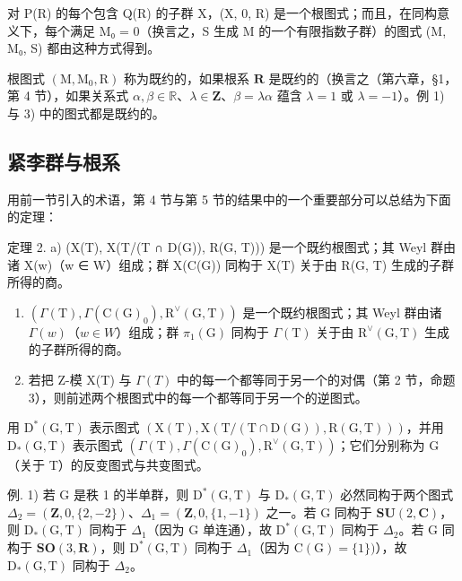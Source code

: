 对 P(R) 的每个包含 Q(R) 的子群 X，(X, 0, R) 是一个根图式；而且，在同构意义下，每个满足 M₀ = 0（换言之，S 生成 M 的一个有限指数子群）的图式 (M, M₀, S) 都由这种方式得到。

根图式 \((\mathrm{M},\mathrm{M}_0,\mathrm{R})\) 称为既约的，如果根系 \(\mathbf{R}\) 是既约的（换言之（第六章，§1，第 4 节），如果关系式 \(\alpha ,\beta \in \mathbb{R}\)、\(\lambda \in \mathbf{Z}\)、\(\beta = \lambda \alpha\) 蕴含 \(\lambda = 1\) 或 \(\lambda = -1\)）。例 1) 与 3) 中的图式都是既约的。

\subsection{紧李群与根系}

用前一节引入的术语，第 4 节与第 5 节的结果中的一个重要部分可以总结为下面的定理：

定理 2. a) (X(T), X(T/(T ∩ D(G)), R(G, T))) 是一个既约根图式；其 Weyl 群由诸 X(w)（w ∈ W）组成；群 X(C(G)) 同构于 X(T) 关于由 R(G, T) 生成的子群所得的商。

\begin{enumerate}
\def\labelenumi{\alph{enumi})}
\setcounter{enumi}{1}
\item
  \((\Gamma(\mathrm{T}),\Gamma(\mathrm{C}(\mathrm{G})_{0}),\mathrm{R}^{\vee}(\mathrm{G},\mathrm{T}))\) 是一个既约根图式；其 Weyl 群由诸 \(\Gamma(w)\)（\(w\in W\)）组成；群 \(\pi_{1}(\mathrm{G})\) 同构于 \(\Gamma(\mathrm{T})\) 关于由 \(\mathrm{R}^{\vee}(\mathrm{G},\mathrm{T})\) 生成的子群所得的商。
\item
  若把 Z-模 X(T) 与 \(\Gamma(T)\) 中的每一个都等同于另一个的对偶（第 2 节，命题 3），则前述两个根图式中的每一个都等同于另一个的逆图式。
\end{enumerate}

用 \(\mathrm{D}^{*}(\mathrm{G},\mathrm{T})\) 表示图式 \((\mathrm{X}(\mathrm{T}),\mathrm{X}(\mathrm{T}/(\mathrm{T}\cap\mathrm{D}(\mathrm{G})),\mathrm{R}(\mathrm{G},\mathrm{T})))\)，并用 \(\mathrm{D}_{*}(\mathrm{G},\mathrm{T})\) 表示图式 \((\varGamma(\mathrm{T}),\varGamma(\mathrm{C}(\mathrm{G})_{0}),\mathrm{R}^{\vee}(\mathrm{G},\mathrm{T}))\)；它们分别称为 G（关于 T）的反变图式与共变图式。

例. 1) 若 G 是秩 1 的半单群，则 \(\mathrm{D}^{*}(\mathrm{G},\mathrm{T})\) 与 \(\mathrm{D}_{*}(\mathrm{G},\mathrm{T})\) 必然同构于两个图式 \(\Delta_{2}=(\mathbf{Z},0,\{2,-2\})\)、\(\Delta_{1}=(\mathbf{Z},0,\{1,-1\})\) 之一。若 G 同构于 \(\mathbf{SU}(2,\mathbf{C})\)，则 \(\mathrm{D}_{*}(\mathrm{G},\mathrm{T})\) 同构于 \(\Delta_{1}\)（因为 G 单连通），故 \(\mathrm{D}^{*}(\mathrm{G},\mathrm{T})\) 同构于 \(\Delta_{2}\)。若 G 同构于 \(\mathbf{SO}(3,\mathbf{R})\)，则 \(\mathrm{D}^{*}(\mathrm{G},\mathrm{T})\) 同构于 \(\Delta_{1}\)（因为 \(\mathrm{C}(\mathrm{G})=\{1\})\)），故 \(\mathrm{D}_{*}(\mathrm{G},\mathrm{T})\) 同构于 \(\Delta_{2}\)。

